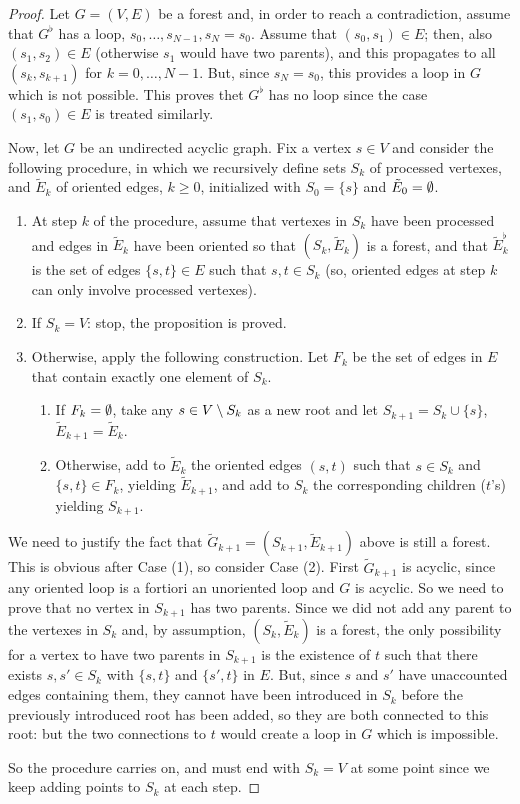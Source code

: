\begin{proof}
Let $G=(V,E)$ be a forest and, in order to reach a contradiction, assume that $G^\flat$ has a loop, $s_0,
\ldots, s_{N-1}, s_N=s_0$. Assume that $(s_0, s_1) \in E$; then, also
$(s_1, s_2)\in E$ (otherwise $s_1$ would have two parents), and this
propagates to all $(s_k,
s_{k+1})$ for $k=0, \ldots, N-1$. But, since $s_N=s_0$, this provides
a loop in $G$ which is not possible. This proves thet $G^\flat$ has no
loop since the case $(s_1,s_0)\in E$ is treated similarly.

Now, let $G$ be an undirected acyclic graph. Fix a vertex $s\in V$ and
consider the following procedure, in which we recursively define sets $S_k$ of processed vertexes, and $\tilde E_k$ of oriented edges, $k\geq 0$, initialized with $S_0 =
\{s\}$ and $\tilde E_0 = \emptyset$.
\begin{enumerate}[label = --]
\item At step $k$ of the procedure,  assume that vertexes in $S_k$ have been processed and edges in $\tilde E_k$
have been oriented so that $(S_k, \tilde E_k)$ is a forest, and  that $\tilde
E_k^\flat$ is the set of edges $\{s,t\}\in E$ such that $s,t\in S_k$ (so,
oriented edges at step $k$ can only involve processed vertexes). 
\item If
$S_k = V$: stop, the proposition is proved.
\item Otherwise,
apply the  following construction. Let $F_k$ be the set of edges
in $E$ that contain exactly one element of $S_k$.
\begin{enumerate}
\item If $F_k = \emptyset$,  take any $s\in V\setminus S_k$ as a new root
and let $S_{k+1} = S_k\cup \{s\}$, $\tilde E_{k+1}=\tilde E_k$.
\item Otherwise, add to $\tilde E_k$ the oriented edges $(s,t)$ such that
$s\in S_k$ and $\{s,t\}\in F_k$, yielding $\tilde E_{k+1}$, and add to $S_k$
the corresponding children ($t$'s) yielding $S_{k+1}$. 
\end{enumerate}
\end{enumerate}

We need to justify the fact that $\tilde G_{k+1} = (S_{k+1}, \tilde
E_{k+1})$ above is
still a forest. This is
obvious after Case (1), so consider Case (2). First $\tilde G_{k+1}$ is
acyclic, since any oriented loop is a fortiori an unoriented loop and
$G$ is acyclic. So we need to prove that no vertex in $S_{k+1}$ has
two parents. Since we did not add any parent to the vertexes in $S_k$
and, by assumption, $(S_k, \tilde E_k)$ is a forest, the only possibility for
a vertex to have two parents in $S_{k+1}$ is the existence of $t$ such
that there exists $s,s'\in S_k$ with $\{s,t\}$ and $\{s', t\}$ in
$E$. But, since $s$ and $s'$ have unaccounted edges containing them,
they cannot have been introduced in $S_k$ before the previously
introduced root has been added, so they are both connected to this
root: but the two connections to $t$ would create a loop in $G$ which
is impossible.

So the procedure carries on, and must end with $S_k=V$ at some point
since we keep adding points to $S_k$ at each step.
\end{proof}


